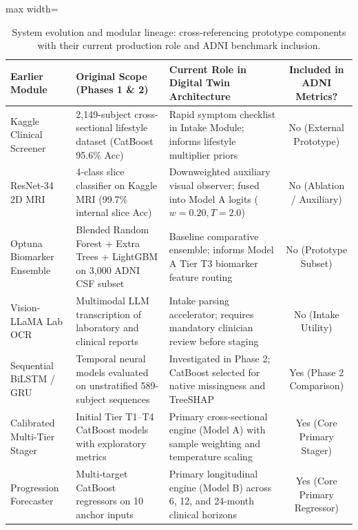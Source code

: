\begin{table}[t]
\centering
\caption{System evolution and modular lineage: cross-referencing prototype components with their current production role and ADNI benchmark inclusion.}
\label{tab:earlier_phase_heritage}
\small
\begin{adjustbox}{max width=\linewidth}
\begin{tabular}{p{3.2cm}p{4.2cm}p{5.5cm}c}
\toprule
\textbf{Earlier Module} & \textbf{Original Scope (Phases 1 \& 2)} & \textbf{Current Role in Digital Twin Architecture} & \textbf{Included in ADNI Metrics?} \\
\midrule
Kaggle Clinical Screener & 2,149-subject cross-sectional lifestyle dataset (CatBoost 95.6\% Acc) & Rapid symptom checklist in Intake Module; informs lifestyle multiplier priors & No (External Prototype) \\
ResNet-34 2D MRI & 4-class slice classifier on Kaggle MRI (99.7\% internal slice Acc) & Downweighted auxiliary visual observer; fused into Model A logits ($w=0.20, T=2.0$) & No (Ablation / Auxiliary) \\
Optuna Biomarker Ensemble & Blended Random Forest + Extra Trees + LightGBM on 3,000 ADNI CSF subset & Baseline comparative ensemble; informs Model A Tier T3 biomarker feature routing & No (Prototype Subset) \\
Vision-LLaMA Lab OCR & Multimodal LLM transcription of laboratory and clinical reports & Intake parsing accelerator; requires mandatory clinician review before staging & No (Intake Utility) \\
Sequential BiLSTM / GRU & Temporal neural models evaluated on unstratified 589-subject sequences & Investigated in Phase 2; CatBoost selected for native missingness and TreeSHAP & Yes (Phase 2 Comparison) \\
Calibrated Multi-Tier Stager & Initial Tier T1--T4 CatBoost models with exploratory metrics & Primary cross-sectional engine (Model A) with sample weighting and temperature scaling & Yes (Core Primary Stager) \\
Progression Forecaster & Multi-target CatBoost regressors on 10 anchor inputs & Primary longitudinal engine (Model B) across 6, 12, and 24-month clinical horizons & Yes (Core Primary Regressor) \\
\bottomrule
\end{tabular}
\end{adjustbox}
\end{table}
